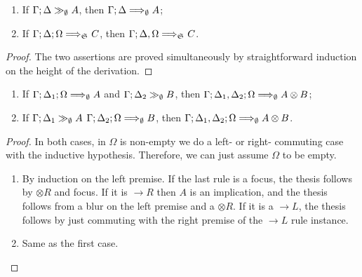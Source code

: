 \begin{theorem}[Soundness]\mbox{}
  \begin{enumerate}
  \item If $\Gamma; \Delta \gg_{\emptyset} A$, then
    $\Gamma ; \Delta \Longrightarrow_{\emptyset} A$;
  \item If $\Gamma; \Delta; \Omega \Longrightarrow_{\mathfrak{S}_{}} C$, then
    $\Gamma ; \Delta, \Omega \Longrightarrow_{\mathfrak{S}_{}} C$.
  \end{enumerate}
\end{theorem}
\begin{proof}
  The two assertions are proved simultaneously by straightforward induction on
  the height of the derivation.
\end{proof}


\begin{lemma}\label{otimeslemma}\mbox{}
  \begin{enumerate}
  \item If $\Gamma; \Delta_1; \Omega \Longrightarrow_{\emptyset} A$ and
    $\Gamma; \Delta_2 \gg_{\emptyset} B$, then
    $\Gamma; \Delta_1, \Delta_2; \Omega \Longrightarrow_{\emptyset} A \otimes B$;
  \item If $\Gamma; \Delta_1 \gg_{\emptyset} A$
    $\Gamma; \Delta_2; \Omega \Longrightarrow_{\emptyset} B$, then
    $\Gamma; \Delta_1, \Delta_2; \Omega \Longrightarrow_{\emptyset} A \otimes B$.
  \end{enumerate}
\end{lemma}
\begin{proof}
  In both cases, in $\Omega$ is non-empty we do a left- or right- commuting case
  with the inductive hypothesis. Therefore, we can just assume $\Omega$ to be
  empty.

  \begin{enumerate}
  \item

    By induction on the left premise. If the last rule is a focus, the thesis
    follows by $\otimes R$ and focus. If it is $\rightarrow R$ then $A$ is an
    implication, and the thesis follows from a blur on the left premise and a
    $\otimes R$. If it is a $\rightarrow L$, the thesis follows by just
    commuting with the right premise of the $\rightarrow L$ rule instance.

  \item Same as the first case.

  \end{enumerate}
\end{proof}

